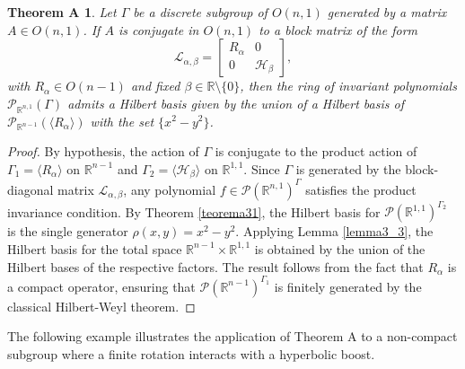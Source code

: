 \documentclass[]{article}
\newtheorem*{theoremA}{Theorem A}
\begin{document}
\begin{theoremA}
	Let $\Gamma$ be a discrete subgroup of $O(n,1)$ generated by a matrix $A \in O(n,1)$. 
	If $A$ is conjugate in $O(n,1)$ to a block matrix of the form
	$$
	\mathcal{L}_{\alpha,\beta} = 
	\begin{bmatrix}
		R_\alpha & 0 \\
		0 & \mathcal{H}_\beta
	\end{bmatrix},
	$$
	with $R_\alpha \in O(n-1)$ and fixed $\beta \in \mathbb{R}\setminus\{0\}$, then the ring of invariant polynomials
	$
	\mathcal{P}_{\mathbb{R}^{n,1}}(\Gamma)
	$
	admits a Hilbert basis given by the union of a Hilbert basis of $\mathcal{P}_{\mathbb{R}^{n-1}}(\langle R_\alpha \rangle)$ with the set $\{x^2 - y^2\}$.
\end{theoremA}
\begin{proof}
	By hypothesis, the action of $\Gamma$ is conjugate to the product action of $\Gamma_1 = \langle R_\alpha \rangle$ on $\mathbb{R}^{n-1}$ and $\Gamma_2 = \langle \mathcal{H}_\beta \rangle$ on $\mathbb{R}^{1,1}$. Since $\Gamma$ is generated by the block-diagonal matrix $\mathcal{L}_{\alpha,\beta}$, any polynomial $f \in \mathcal{P}(\mathbb{R}^{n,1})^\Gamma$ satisfies the product invariance condition. By Theorem \ref{teorema31}, the Hilbert basis for $\mathcal{P}(\mathbb{R}^{1,1})^{\Gamma_2}$ is the single generator $\rho(x,y) = x^2 - y^2$. Applying Lemma \ref{lemma3_3}, the Hilbert basis for the total space $\mathbb{R}^{n-1} \times \mathbb{R}^{1,1}$ is obtained by the union of the Hilbert bases of the respective factors. The result follows from the fact that $R_\alpha$ is a compact operator, ensuring that $\mathcal{P}(\mathbb{R}^{n-1})^{\Gamma_1}$ is finitely generated by the classical Hilbert-Weyl theorem.
\end{proof}

\medskip

The following example illustrates the application of Theorem A to a non-compact subgroup where a finite rotation interacts with a hyperbolic boost.
\end{document}
